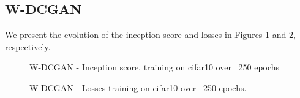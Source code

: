 \subsection{W-DCGAN}
\label{sec:exp-wdcgan}
We present the evolution of the inception score and losses in Figures \ref{fig:exp-wdcgan-is} and \ref{fig:exp-wdcgan-losses}, respectively.
   
\begin{figure}[h]
\centering
\caption{W-DCGAN - Inception score, training on cifar10 over ~250 epochs}
\label{fig:exp-wdcgan-is}
\end{figure}

\begin{figure}[h]
\centering
\caption{W-DCGAN - Losses training on cifar10 over ~250 epochs.}
\label{fig:exp-wdcgan-losses}
\end{figure}